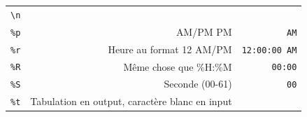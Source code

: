 \documentclass[12pt,]{book}
\numberwithin{equation}{section}
\numberwithin{countremarque}{section}
\begin{document}
\begin{longtable}[]{@{}rrr@{}}
\begin{minipage}[t]{0.22\columnwidth}
\texttt{\textbackslash{}n}\strut
\end{minipage}\tabularnewline
\begin{minipage}[t]{0.10\columnwidth}\raggedleft\strut
\texttt{\%p}\strut
\end{minipage} & \begin{minipage}[t]{0.60\columnwidth}\raggedleft\strut
AM/PM PM\strut
\end{minipage} & \begin{minipage}[t]{0.22\columnwidth}\raggedleft\strut
\texttt{AM}\strut
\end{minipage}\tabularnewline
\begin{minipage}[t]{0.10\columnwidth}\raggedleft\strut
\texttt{\%r}\strut
\end{minipage} & \begin{minipage}[t]{0.60\columnwidth}\raggedleft\strut
Heure au format 12 AM/PM\strut
\end{minipage} & \begin{minipage}[t]{0.22\columnwidth}\raggedleft\strut
\texttt{12:00:00\ AM}\strut
\end{minipage}\tabularnewline
\begin{minipage}[t]{0.10\columnwidth}\raggedleft\strut
\texttt{\%R}\strut
\end{minipage} & \begin{minipage}[t]{0.60\columnwidth}\raggedleft\strut
Même chose que \%H:\%M\strut
\end{minipage} & \begin{minipage}[t]{0.22\columnwidth}\raggedleft\strut
\texttt{00:00}\strut
\end{minipage}\tabularnewline
\begin{minipage}[t]{0.10\columnwidth}\raggedleft\strut
\texttt{\%S}\strut
\end{minipage} & \begin{minipage}[t]{0.60\columnwidth}\raggedleft\strut
Seconde (00-61)\strut
\end{minipage} & \begin{minipage}[t]{0.22\columnwidth}\raggedleft\strut
\texttt{00}\strut
\end{minipage}\tabularnewline
\begin{minipage}[t]{0.10\columnwidth}\raggedleft\strut
\texttt{\%t}\strut
\end{minipage} & \begin{minipage}[t]{0.60\columnwidth}\raggedleft\strut
Tabulation en output, caractère blanc en input\strut
\end{minipage} & \begin{minipage}[t]{0.22\columnwidth}\raggedleft\strut

\end{minipage}
\end{longtable}
\end{document}
